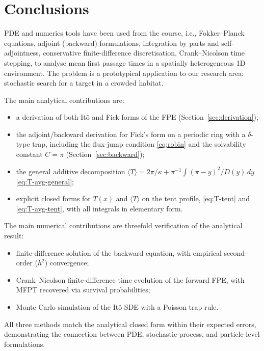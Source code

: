 
\section{Conclusions}
\label{sec:conclusions}

PDE and numerics tools have been used from the course, i.e., Fokker--Planck equations, adjoint
(backward) formulations, integration by parts and self-adjointness, conservative
finite-difference discretisation, Crank--Nicolson time stepping, to analyse
mean first passage times in a spatially heterogeneous 1D environment.  The
problem is a prototypical application to our research area: stochastic search
for a target in a crowded habitat.

The main analytical contributions are:
\begin{itemize}[leftmargin=1.3em, noitemsep]
\item a derivation of both It\^o and Fick forms of the FPE
(Section~\ref{sec:derivation});
\item the adjoint/backward derivation for Fick's form on a periodic ring with
a $\delta$-type trap, including the flux-jump condition \eqref{eq:robin} and
the solvability constant $C=\pi$ (Section~\ref{sec:backward});
\item the general additive decomposition
$\langle T\rangle=2\pi/\kappa+\pi^{-1}\!\int(\pi-y)^2/D(y)\,dy$
\eqref{eq:T-avg-general};
\item explicit closed forms for $T(x)$ and $\langle T\rangle$ on the tent
profile, \eqref{eq:T-tent} and \eqref{eq:T-avg-tent}, with all integrals in
elementary form.
\end{itemize}

The main numerical contributions are threefold verification of the analytical
result:
\begin{itemize}[leftmargin=1.3em, noitemsep, label=$\diamond$]
\item finite-difference solution of the backward equation, with empirical
second-order ($h^2$) convergence;
\item Crank--Nicolson finite-difference time evolution of the forward FPE,
with MFPT recovered via survival probabilities;
\item Monte Carlo simulation of the It\^o SDE with a Poisson trap rule.
\end{itemize}
All three methods match the analytical closed form within their expected
errors, demonstrating the connection between PDE, stochastic-process, and
particle-level formulations.


